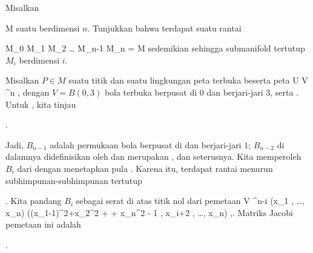 {

Misalkan

\mavergleichskette
{\vergleichskette
{ M
}
{ \neq }{ \emptyset
}
{  }{
}
{    }{
}
{   }{
}
}
{}{}{}
suatu
berdimensi $n$. Tunjukkan bahwa terdapat suatu rantai

\mavergleichskettedisp
{\vergleichskette
{ M_0
}
{ \subseteq} { M_1
}
{ \subseteq} { M_2
}
{ \subseteq  \ldots \subseteq} { M_{n-1}
}
{ \subseteq} { M_n
}
}
{
\vergleichskettefortsetzung
{ =} { M
}
{ } {}
{ } {}
{ } {}
}{}{}
sedemikian sehingga submanifold tertutup $M_i$ berdimensi $i$.

}
{

Misalkan $P \in M$ suatu titik dan
 suatu lingkungan peta terbuka beserta peta
\maabbdisp {\alpha} { U } {V \subseteq \R^n
} {,}
dengan $V=B(0,3)$ bola terbuka berpusat di $0$ dan berjari-jari $3$, serta
. Untuk
, kita tinjau

 { . }

Jadi, $B_{n-1}$ adalah permukaan bola berpusat di
 dan berjari-jari $1$; $B_{n-2}$ di dalamnya didefinisikan oleh
 dan merupakan , dan seterusnya. Kita memperoleh $B_i$ dari
 dengan menetapkan pula
. Karena itu, terdapat rantai menurun subhimpunan-subhimpunan tertutup

 {  }

 {} {.}
Kita pandang $B_i$ sebagai serat di atas titik nol dari pemetaan
 { V } {\R^{n-i}
} {(x_1 , \ldots , x_n) } {  ((x_1-1)^2+x_2^2 + \cdots + x_n^2 - 1 , x_{i+2} , \ldots , x_n)
} {,}.
Matriks Jacobi pemetaan ini adalah

 { . }

}

